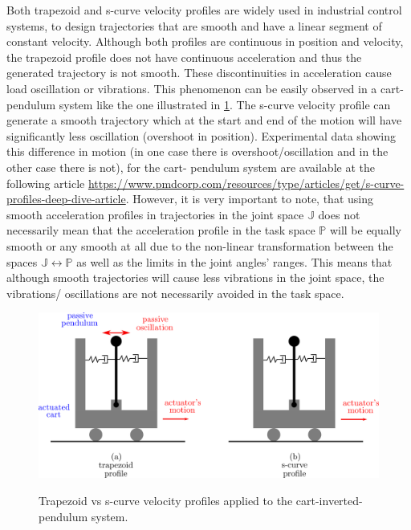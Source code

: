 Both trapezoid and s-curve velocity profiles are widely used in industrial control systems, to design trajectories that are smooth and have a linear segment of constant velocity. Although both profiles are continuous in
position and velocity, the trapezoid profile does not have continuous acceleration and thus the generated trajectory is not smooth. These discontinuities in acceleration cause load oscillation or vibrations. This 
phenomenon can be easily observed in a cart-pendulum system like the one illustrated in \ref{cart-pendulum-passive-wrist-analogy}. The s-curve velocity profile can generate a smooth trajectory which at the start and end of 
the motion will have significantly less oscillation (overshoot in position). Experimental data showing this difference in motion (in one case there is overshoot/oscillation and in the other case there is not), for the cart-
pendulum system are available at the following article \url{https://www.pmdcorp.com/resources/type/articles/get/s-curve-profiles-deep-dive-article}. However, it is very important to note, that using smooth acceleration 
profiles in trajectories in the joint space $\mathbb{J}$ does not necessarily mean that the acceleration profile in the task space $\mathbb{P}$ will be equally smooth or any smooth at all due to the non-linear transformation 
between the spaces $\mathbb{J} \longleftrightarrow \mathbb{P}$ as well as the limits in the joint angles' ranges. This means that although smooth trajectories will cause less vibrations in the joint space, the vibrations/
oscillations are not necessarily avoided in the task space.

\begin{center}
\begin{figure}[!htb]
\centering
\includegraphics[width=\textwidth]{images/cart-pendulum-passive-wrist-analogy.png}\\
\caption{Trapezoid vs s-curve velocity profiles applied to the cart-inverted-pendulum system.} 
\label{cart-pendulum-passive-wrist-analogy}
\end{figure}
\end{center}

